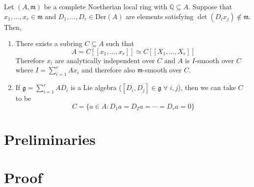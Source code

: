 \documentclass[oneside, 12pt]{scrbook}
\newcommand{\QQ}{\mathbb Q}
\newcommand{\m}{\mathfrak{m}}
\theoremstyle{theorem}
\begin{document}
\begin{theorem}
Let $(A, \m)$ be a complete Noetherian local ring with $\QQ \subseteq A$. Suppose that $x_{1}, \hdots , x_{r} \in \m$ and $D_{1}, \hdots , D_{r} \in \mathrm{Der}(A)$ are elements satisfying $\det (D_{i}x_{j}) \not \in \m$. Then, 
\begin{enumerate}
\item There exists a subring $C \subseteq A$ such that 
\begin{equation}
A = C[[x_{1}, \hdots , x_{r}]] \simeq C[[X_{1}, \hdots , X_{r}]]
\end{equation}
Therefore $x_{i}$ are analytically independent over $C$ and $A$ is $I$-smooth over $C$ where $I = \sum_{i=1}^{r} Ax_{i}$ and therefore also $\m$-smooth over $C$.
\item If $\mathfrak{g}= \sum_{i=1}^{r} A D_{i}$ is a Lie algebra ($[D_{i},D_{j}] \in \mathfrak{g} \; \forall \; i,j$), then we can take $C$ to be 
\begin{equation}
C=\{a\in A : D_{1}a = D_{2}a  = \cdots = D_{r}a = 0\}
\end{equation}
\end{enumerate}
\end{theorem}

\section{Preliminaries}



\section{Proof}
\end{document}
